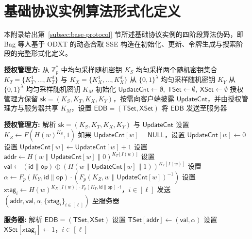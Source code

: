 \chapter{基础协议实例算法形式化定义}\label{app:base-protocol}

本附录给出第~\ref{subsec:base-protocol} 节所述基础协议实例的四阶段算法伪码，即 Bag 等人\cite{10.1145/3634737.3657018}基于 ODXT\cite{patranabis2021forward} 的动态合取 SSE 构造在初始化、更新、令牌生成与搜索阶段的完整形式化定义。

\begin{breakablealgorithm}
\caption{初始化流程 $\mathsf{Setup}$}
\label{alg:sse-setup}
\begin{algorithmic}[1]
\item[] \textbf{授权管理方:}
\STATE 从 $\mathbb{Z}_p^*$ 中均匀采样随机密钥 $K_S$
\STATE 均匀采样两个随机密钥集合 $K_T=\{K_T^1,\ldots,K_T^d\}$ 与 $K_X=\{K_X^1,\ldots,K_X^d\}$
\STATE 从 $\{0,1\}^{\lambda}$ 均匀采样随机密钥 $K_Y$
\STATE 从 $\{0,1\}^{\lambda}$ 均匀采样随机密钥 $K_M$
\STATE 初始化 $\mathsf{UpdateCnt}\leftarrow\emptyset,\ \mathsf{TSet}\leftarrow\emptyset,\ \mathsf{XSet}\leftarrow\emptyset$
\STATE 授权管理方保留 $\mathsf{sk}=(K_S,K_T,K_X,K_Y)$，按需向客户端披露 $\mathsf{UpdateCnt}$，并由授权管理方与服务器共享 $K_M$，设置 $\mathsf{EDB}=(\mathsf{TSet},\mathsf{XSet})$
\STATE 将 $\mathsf{EDB}$ 发送至服务器
\end{algorithmic}
\end{breakablealgorithm}

\begin{breakablealgorithm}
\caption{更新流程 $\mathsf{Update}$}
\label{alg:sse-update}
\begin{algorithmic}[1]
\item[] \textbf{授权管理方:}
\STATE 解析 $\mathsf{sk}=(K_S,K_T,K_X,K_Y)$ 与 $\mathsf{UpdateCnt}$
\STATE 设置 $K_Z \leftarrow F(H(w)^{K_S},1)$
\STATE 如果 $\mathsf{UpdateCnt}[w]=\mathsf{NULL}$，设置 $\mathsf{UpdateCnt}[w]\leftarrow 0$
\STATE 设置 $\mathsf{UpdateCnt}[w]\leftarrow \mathsf{UpdateCnt}[w]+1$
\STATE 设置 $\mathsf{addr}\leftarrow H(w\|\mathsf{UpdateCnt}[w]\|0)^{K_T[I(w)]}$
\STATE 设置 $\mathsf{val}\leftarrow (\mathsf{id}\|\mathsf{op})\oplus (H(w\|\mathsf{UpdateCnt}[w]\|1))^{K_T[I(w)]}$
\STATE 设置 $\alpha\leftarrow F_p(K_Y,\mathsf{id}\|\mathsf{op})\cdot (F_p(K_Z,w\|\mathsf{UpdateCnt}[w])^{-1})$
\STATE 设置 $\mathsf{xtag}_i\leftarrow H(w)^{K_X[I(w)]\cdot F_p(K_Y,\mathsf{id}\|\mathsf{op})\cdot i}$，$i\in[\ell]$
\STATE 发送 $(\mathsf{addr},\mathsf{val},\alpha,\{\mathsf{xtag}_i\}_{i\in[\ell]})$ 至服务器
\item[] \textbf{服务器:}
\STATE 解析 $\mathsf{EDB}=(\mathsf{TSet},\mathsf{XSet})$
\STATE 设置 $\mathsf{TSet}[\mathsf{addr}]\leftarrow (\mathsf{val},\alpha)$
\STATE 设置 $\mathsf{XSet}[\mathsf{xtag}_i]\leftarrow 1$，$i\in[\ell]$
\end{algorithmic}
\end{breakablealgorithm}

